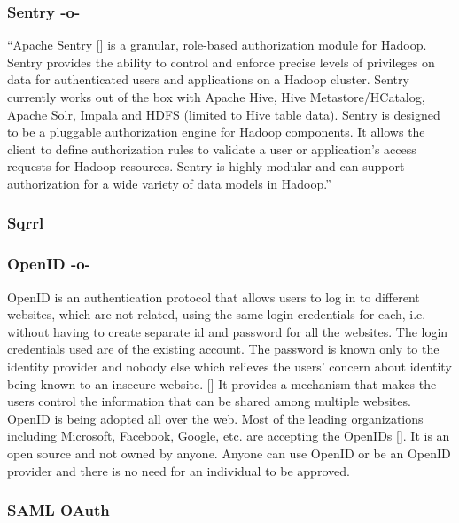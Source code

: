 \subsubsection{Sentry -o-}

``Apache Sentry [\cite{www-sentry}] is a granular, role-based
authorization module for Hadoop. Sentry provides the ability to
control and enforce precise levels of privileges on data for
authenticated users and applications on a Hadoop cluster. Sentry
currently works out of the box with Apache Hive, Hive
Metastore/HCatalog, Apache Solr, Impala and HDFS (limited to Hive
table data). Sentry is designed to be a pluggable authorization engine
for Hadoop components. It allows the client to define authorization
rules to validate a user or application's access requests for Hadoop
resources. Sentry is highly modular and can support authorization for
a wide variety of data models in Hadoop.''

\subsubsection{Sqrrl}
\subsubsection{OpenID  -o-}

OpenID is an authentication protocol that allows users to log in to
different websites, which are not related, using the same login
credentials for each, i.e. without having to create separate id and
password for all the websites. The login credentials used are of the
existing account. The password is known only to the identity provider
and nobody else which relieves the users' concern about identity being
known to an insecure website. [\cite{ope1}] It provides a mechanism that
makes the users control the information that can be shared among
multiple websites. OpenID is being adopted all over the web. Most of
the leading organizations including Microsoft, Facebook, Google,
etc. are accepting the OpenIDs [\cite{ope2}]. It is an open source and
not owned by anyone. Anyone can use OpenID or be an OpenID provider
and there is no need for an individual to be approved.

\subsubsection{SAML OAuth}

